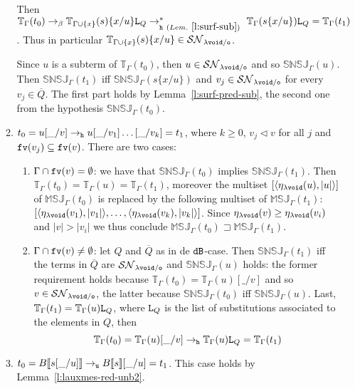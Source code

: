 \documentclass{LMCS}
\renewcommand{\>}{\rightarrow}
\def\lam{\lambda}
\def\Gam{\Gamma}
\newcommand{\Rew}[1]{\rightarrow_{#1}}
\newcommand{\Rewn}[2][*]{\rightarrow^{#1}_{#2}}
\newcommand{\isubs}[1]{ \{ #1  \} }
\newcommand{\SN}[1]{\mathcal{SN}_{#1}}
\newcommand{\multiset}[1]{ [ #1 ] }
\newcommand{\B}{{\tt dB}}
\newcommand{\pair}[2]{\langle #1, #2 \rangle}
\newcommand{\fv}[1]{{\tt fv}(#1)}
\newcommand{\set}[1]{ \{ #1 \}}
\newcommand{\ems}{\emptyset}
\newcommand{\unboxed}{{\tt u}}
\newcommand{\modulo}[2]{#1/#2}
\newcommand{\osymb}{{\tt o}}
\newcommand{\aux}{{\tt void}}
\newcommand{\laux}{\lam\aux}
\newcommand{\lauxm}{\lam\modulo{ \aux }{ \osymb }}
\newcommand{\New}{{\tt h}}
\newcommand{\snsudd}[2]{\mathbb{SNSJ}_{#1}(#2)}
\newcommand{\ctx}[2]{#1 [ \! [#2] \! ]}
\newcommand{\etamd}[2]{\mathbb{MSJ}_{#1}(#2)}
\newcommand{\List}{{\tt L}}
\newcommand{\surf}[2]{\mathbb{T}_{#1}(#2)}
\newcommand{\void}{\_}
\newcommand{\gm}{\sqsupset}
\newcommand{\subt}{\triangleleft}
\begin{document}
\begin{enumerate}[$\bullet$]
\begin{enumerate}[$-$]
Then 
    $\surf{\Gam}{t_0}\Rew{\beta}
    \surf{\Gam\cup\set{x}}{s} \isubs{x/u}\List_Q \Rewn{\New\ (Lem.~\ref{l:surf-sub})}\ \surf{\Gam}{s\isubs{x/u}}\List_Q=\surf{\Gam}{t_1}$. Thus in particular $\surf{\Gam\cup\set{x}}{s} \isubs{x/u} \in \SN{\lauxm}$.

 Since $u$ is a
    subterm of $\surf{\Gam}{t_0}$, then  $u\in\SN{\lauxm}$ and so
    $\snsudd{\Gam}{u}$. Then $\snsudd{\Gam}{t_1}$ iff $\snsudd{\Gam}{s
      \isubs{x/u}}$ and $v_j\in\SN{\lauxm}$ for every $v_j\in \overline{Q}$. The first part  holds by  Lemma~\ref{l:surf-pred-sub}, the second one from the
hypothesis $\snsudd{\Gam}{t_0}$. 

\item $t_0 = u[\void/v] \Rew{\New}  u[\void/v_1] \ldots [\void/v_k]= t_1$, where 
  $k \geq 0$, $v_j \subt v$ for all $j$ and $\fv{v_j} \subseteq \fv{v}$. There are two cases:
  \begin{enumerate}[(1)]
  \item \emph{$\Gam\cap\fv{v}=\ems$}: we have that $\snsudd{\Gam}{t_0}$ implies
    $\snsudd{\Gam}{t_1}$. Then $\surf{\Gam}{t_0} = \surf{\Gam}{u} =
    \surf{\Gam}{t_1}$, moreover the multiset
    $\multiset{\pair{\eta_{\laux}(u)}{|u|}}$ of
$\etamd{\Gam}{t_0}$ is replaced by the following multiset of
        $\etamd{\Gam}{t_1}$: 
      $\multiset{\pair{\eta_{\laux}(v_1)}{|v_1|}, \ldots,
        \pair{\eta_{\laux}(v_k)}{|v_k|}}$.  Since $\eta_{\laux}(v) \geq
        \eta_{\laux}(v_i)$ and $|v| > |v_i|$ we thus
        conclude $\etamd{\Gam}{t_0} \gm \etamd{\Gam}{t_1}$.

\item \emph{$\Gam\cap\fv{v}\neq\ems$}: let $Q$ and 
  $\overline{Q}$ as in de $\B$-case. Then  $\snsudd{\Gam}{t_1}$ iff
  the terms in $\overline{Q}$ are $\SN{\lauxm}$ and $\snsudd{\Gam}{u}$
  holds: the former requirement holds because
  $\surf{\Gam}{t_0}=\surf{\Gam}{u}[\void/v]$ and so $v\in\SN{\lauxm}$, the
  latter because  $\snsudd{\Gam}{t_0}$ iff 
  $\snsudd{\Gam}{u}$. Last, $\surf{\Gam}{t_1}=\surf{\Gam}{u}\List_Q$,
  where $\List_Q$ is the list of substitutions associated to the elements
  in $Q$, then 
$$\surf{\Gam}{t_0}=\surf{\Gam}{u}[\void/v]\Rew{\New}\surf{\Gam}{u}\List_Q=\surf{\Gam}{t_1}$$

  \end{enumerate}

\item $t_0= \ctx{B}{s[\void/u]} \Rew{\unboxed} \ctx{B}{s}[\void/u] = t_1$. This case holds by Lemma~\ref{l:lauxmes-red-unb2}.
\end{enumerate}


\end{enumerate}
\end{document}
